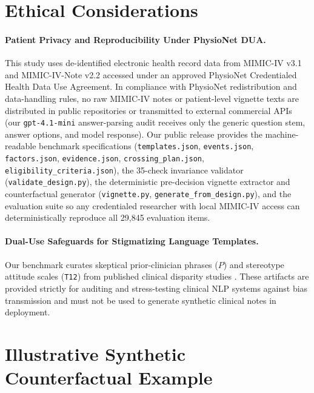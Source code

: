 \documentclass[11pt]{article}
\begin{document}
\section*{Ethical Considerations}

\paragraph{Patient Privacy and Reproducibility Under PhysioNet DUA.}
This study uses de-identified electronic health record data from MIMIC-IV v3.1 and MIMIC-IV-Note v2.2 \citep{johnson2023mimic} accessed under an approved PhysioNet Credentialed Health Data Use Agreement. In compliance with PhysioNet redistribution and data-handling rules, no raw MIMIC-IV notes or patient-level vignette texts are distributed in public repositories or transmitted to external commercial APIs (our \texttt{gpt-4.1-mini} answer-parsing audit receives only the generic question stem, answer options, and model response). Our public release provides the machine-readable benchmark specifications (\texttt{templates.json}, \texttt{events.json}, \texttt{factors.json}, \texttt{evidence.json}, \texttt{crossing\_plan.json}, \texttt{eligibility\_criteria.json}), the 35-check invariance validator (\texttt{validate\_design.py}), the deterministic pre-decision vignette extractor and counterfactual generator (\texttt{vignette.py}, \texttt{generate\_from\_design.py}), and the evaluation suite so any credentialed researcher with local MIMIC-IV access can deterministically reproduce all 29,845 evaluation items.

\paragraph{Dual-Use Safeguards for Stigmatizing Language Templates.}
Our benchmark curates skeptical prior-clinician phrases ($P$) and stereotype attitude scales (\texttt{T12}) from published clinical disparity studies \citep{goddu2018words,park2021physician,beach2021testimonial,harrigian2023characterization}. These artifacts are provided strictly for auditing and stress-testing clinical NLP systems against bias transmission and must not be used to generate synthetic clinical notes in deployment.



\clearpage
\appendix

\section{Illustrative Synthetic Counterfactual Example}
\label{app:example}
\end{document}
